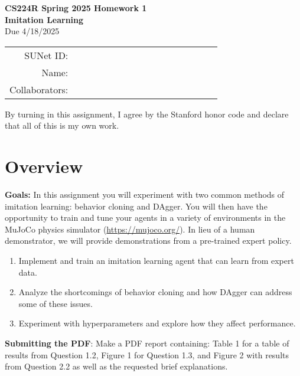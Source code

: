 \documentclass[12pt]{article}
\begin{document}
\begin{center}
{\Large \textbf{CS224R Spring 2025 Homework 1 \\ Imitation Learning}}
\\ {\large Due 4/18/2025}

\begin{tabular}{rl}
SUNet ID: & $\hspace{6cm}$\\
Name: & \\
Collaborators: & 
\end{tabular}
\end{center}

\noindent By turning in this assignment, I agree by the Stanford honor code and declare
that all of this is my own work. 

\section*{Overview}

\textbf{Goals:} In this assignment you will experiment with two common methods of imitation learning: behavior cloning and DAgger. You will then have the opportunity to train and tune your agents in a variety of environments in the MuJoCo physics simulator (\url{https://mujoco.org/}). In lieu of a human demonstrator, we will provide demonstrations from a pre-trained expert policy.
\begin{enumerate} 
    \item Implement and train an imitation learning agent that can learn from expert data.
    \item Analyze the shortcomings of behavior cloning and how DAgger can address some of these issues. 
    \item Experiment with hyperparameters and explore how they affect performance.
\end{enumerate}

\vspace{0.2cm}
\noindent\textbf{Submitting the PDF}: Make a PDF report containing: Table 1 for a table of results from Question 1.2, Figure 1 for Question 1.3, and Figure 2 with results from Question 2.2 as well as the requested brief explanations. \\ 
\end{document}
